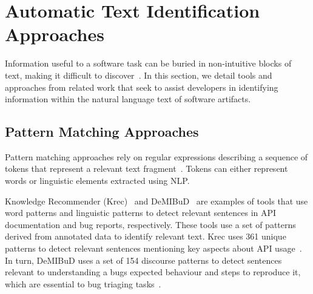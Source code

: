 \section{Automatic Text Identification Approaches}
\label{cp2:automatic-approaches}



Information useful to a software task can be buried in  
non-intuitive blocks of text, making it difficult to discover~\cite{Robillard2015}.
In this section, we detail tools and approaches from related work
that seek to assist developers in 
identifying information within the natural language
text of software artifacts.





\subsection{Pattern Matching Approaches}
\label{cp2:pattern-matching}


Pattern matching approaches rely on regular expressions describing a sequence of tokens that represent
 a relevant text fragment~\cite{Bavota2016}. Tokens can either represent words or linguistic elements 
extracted using \acf{NLP}.
    

Knowledge Recommender (Krec)~\cite{Robillard2015} 
and {\small DeMIBuD}~\cite{Chaparro2017} are examples 
of tools that use word patterns and linguistic patterns to 
detect relevant sentences in   API documentation and bug reports, respectively. 
These tools use a set of patterns derived from annotated data to identify relevant text. Krec  uses  361 unique patterns
to 
detect relevant sentences mentioning key aspects about API usage~\cite{Robillard2015}.
In turn, {\small DeMIBuD} uses a set of 154 discourse patterns to detect sentences 
relevant to understanding a bugs expected behaviour and steps to reproduce it,
which are essential to bug triaging tasks~\cite{Chaparro2017}.







